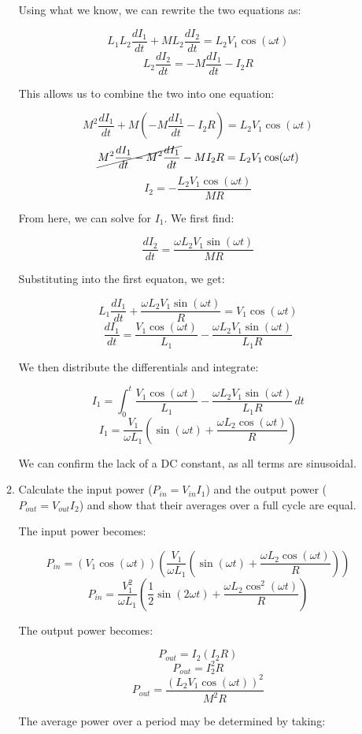\begin{enumerate}
\begin{enumerate}
        Using what we know, we can rewrite the two equations as:


        $$L_1L_2\frac{dI_1}{dt}+ML_2\frac{dI_2}{dt}=L_2V_1\cos(\omega t)$$
        $$L_2\frac{dI_2}{dt}=-M\frac{dI_1}{dt}-I_2R$$

        This allows us to combine the two into one equation:

        $$M^2\frac{dI_1}{dt}+M\left( -M\frac{dI_1}{dt}-I_2R \right)=L_2V_1\cos(\omega t)$$
        $$\cancel{M^2\frac{dI_1}{dt}-M^2\frac{dI_1}{dt}}-MI_2R=L_2V_1\cos(\omega t)$$
        $$\boxed{I_2=-\frac{L_2V_1\cos(\omega t)}{MR}}$$

        From here, we can solve for $I_1$. We first find:

        $$\frac{dI_2}{dt}=\frac{\omega L_2V_1\sin(\omega t)}{MR}$$

        Substituting into the first equaton, we get:

        $$L_1\frac{dI_1}{dt}+\frac{\omega L_2V_1\sin(\omega t)}{R}=V_1\cos(\omega t)$$
        $$\frac{dI_1}{dt}=\frac{V_1\cos(\omega t)}{L_1}-\frac{\omega L_2V_1\sin(\omega t)}{L_1R}$$

        We then distribute the differentials and integrate:

        $$I_1=\int_0^t\frac{V_1\cos(\omega t)}{L_1}-\frac{\omega L_2V_1\sin(\omega t)}{L_1R}\,dt$$
        $$\boxed{I_1=\frac{V_1}{\omega L_1}\left(\sin(\omega t) +\frac{\omega L_2\cos(\omega t)}{R}\right)}$$

        We can confirm the lack of a DC constant, as all terms are sinusoidal.

      \item Calculate the input power ($P_{in}=V_{in}I_1$) and the output power ($P_{out}=V_{out}I_2$) and show that their averages over a full cycle are equal.

        The input power becomes:

        $$P_{in}=\left( V_1\cos(\omega t) \right)\left( \frac{V_1}{\omega L_1}\left(\sin(\omega t) +\frac{\omega L_2\cos(\omega t)}{R}\right)\right)$$
        $$\boxed{P_{in}=\frac{V_1^2}{\omega L_1}\left(\frac{1}{2}\sin(2\omega t) +\frac{\omega L_2\cos^2(\omega t)}{R}\right)}$$

        The output power becomes:

        $$P_{out}=I_2(I_2R)$$
        $$P_{out}=I_2^2R$$
        $$\boxed{P_{out}=\frac{(L_2V_1\cos(\omega t))^2}{M^2R}}$$

        The average power over a period may be determined by taking:


\end{enumerate}
\end{enumerate}
